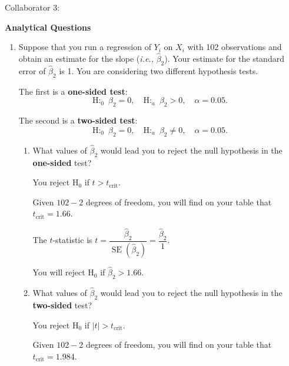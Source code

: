 \documentclass[11pt]{article}
\begin{document}
\begin{onehalfspacing}
\vspace{0.1in}

Collaborator 3: 		
			

\newpage


\begin{center}
\textbf{Analytical Questions} \bigskip
\end{center}

\begin{enumerate}
	
\item Suppose that you run a regression of $Y_i$ on $X_i$ with 102 observations and obtain an estimate for the slope (\textit{i.e.,} $\hat{\beta}_2$). Your estimate for the standard error of $\hat{\beta}_2$ is 1. You are considering two different hypothesis tests. 

The first is a \textbf{one-sided test}:
$$\text{H:}_0 \enspace \beta_2 = 0, \quad \text{H:}_a \enspace \beta_2 > 0, \quad \alpha = 0.05.$$

The second is a \textbf{two-sided test}:
$$\text{H:}_0 \enspace \beta_2 = 0, \quad \text{H:}_a \enspace \beta_2 \neq 0, \quad \alpha = 0.05.$$

\begin{enumerate}
	\item What values of $\hat{\beta}_2$ would lead you to reject the null hypothesis in the \textbf{one-sided} test?\\
	
		{\color{pine_green} You reject $\text{H}_0$ if $t > t_\text{crit}$. 
		
		Given $102 - 2$ degrees of freedom, you will find on your table that $t_\text{crit} = 1.66$.
		
		The $t$-statistic is $t = \dfrac{\hat{\beta}_2}{\mathop{\text{SE}}(\hat{\beta}_2)} = \dfrac{\hat{\beta}_2}{1}$.
		
		You will reject $\text{H}_0$ if $\hat{\beta}_2 > 1.66$.\\
		
	}
	
	\item What values of $\hat{\beta}_2$ would lead you to reject the null hypothesis in the \textbf{two-sided} test?\\
	
		
	{\color{pine_green} You reject $\text{H}_0$ if $|t| > t_\text{crit}$. 
		
		Given $102 - 2$ degrees of freedom, you will find on your table that $t_\text{crit} = 1.984$.
		
}
\end{enumerate}
\end{enumerate}
\end{onehalfspacing}
\end{document}
